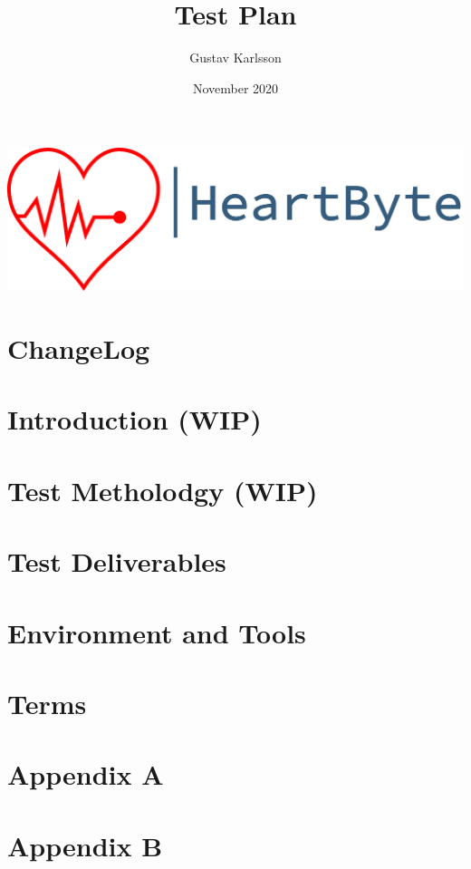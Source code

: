 \documentclass{article}
\title{Test Plan}
\author{Gustav Karlsson }
\date{November 2020}
\begin{document}
\maketitle
\vfill
\includegraphics[width=\linewidth]{Pictures/logo_heartbyte_transparent_v_1_1 (1)}

    \vfill
\clearpage


\section*{ChangeLog}


\clearpage
\section{Introduction (WIP)}


\section{Test Metholodgy (WIP)}


\section{Test Deliverables}

\section{Environment and Tools}

\section{Terms}

\section*{Appendix A}

\section*{Appendix B}
\end{document}
